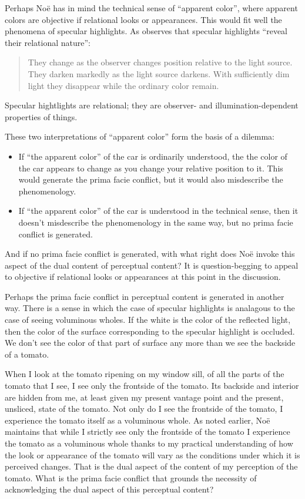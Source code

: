 \documentclass[12pt]{article}
\begin{document}
Perhaps Noë has in mind the technical sense of ``apparent color'', where apparent colors are objective if relational looks or appearances. This would fit well the phenomena of specular highlights. As \citet[141]{Johnston:1992ck} observes that specular highlights ``reveal their relational nature'':
	\begin{quote}
		They change as the observer changes position relative to the light source. They darken markedly as the light source darkens. With sufficiently dim light they disappear while the ordinary color remain.
	\end{quote}
Specular hightlights are relational; they are observer- and illumination-dependent properties of things.

	These two interpretations of ``apparent color'' form the basis of a dilemma:
	\begin{itemize}
		\item If ``the apparent color'' of the car is ordinarily understood, the the color of the car appears to change as you change your relative position to it. This would generate the prima facie conflict, but it would also misdescribe the phenomenology. 
		\item If ``the apparent color'' of the car is understood in the technical sense, then it doesn't misdescribe the phenomenology in the same way, but no prima facie conflict is generated. 
	\end{itemize}
And if no prima facie conflict is generated, with what right does Noë invoke this aspect of the dual content of perceptual content? It is question-begging to appeal to objective if relational looks or appearances at this point in the discussion.

Perhaps the prima facie conflict in perceptual content is generated in another way. There is a sense in which the case of specular highlights is analagous to the case of seeing voluminous wholes. If the white is the color of the reflected light, then the color of the surface corresponding to the specular highlight is occluded. We don't see the color of that part of surface any more than we see the backside of a tomato. 

When I look at the tomato ripening on my window sill, of all the parts of the tomato that I see, I see only the frontside of the tomato. Its backside and interior are hidden from me, at least given my present vantage point and the present, unsliced, state of the tomato. Not only do I see the frontside of the tomato, I experience the tomato itself as a voluminous whole. As noted earlier, Noë maintains that while I strictly see only the frontside of the tomato I experience the tomato as a voluminous whole thanks to my practical understanding of how the look or appearance of the tomato will vary as the conditions under which it is perceived changes. That is the dual aspect of the content of my perception of the tomato. What is the prima facie conflict that grounds the necessity of acknowledging the dual aspect of this perceptual content?
\end{document}

